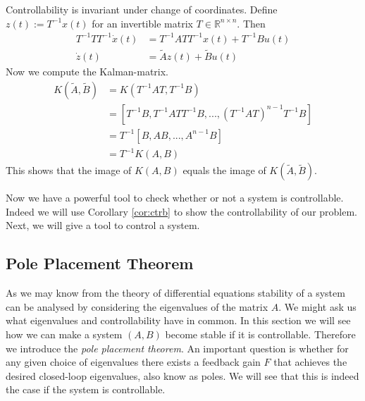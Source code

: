 \begin{myrem}\label{rem:2.11}
    Controllability is invariant under change of coordinates. Define $z(t) := T^{-1} x(t)$ for an invertible matrix $T \in \mathbb{R}^{n\times n}$. Then
\begin{align*}
	T^{-1}TT^{-1}\dot{x}(t) &= T^{-1}ATT^{-1}x(t)+T^{-1}Bu(t)\\
	\dot{z}(t) &= \tilde{A}z(t) + \tilde{B}u(t)
\end{align*}
Now we compute the Kalman-matrix.
\begin{align*}
	K(\tilde{A},\tilde{B}) &= K(T^{-1}AT, T^{-1}B)\\
	&= [T^{-1}B, T^{-1}ATT^{-1}B,...,(T^{-1}AT)^{n-1}T^{-1}B] \\
	&= T^{-1} [B,AB,...,A^{n-1}B] \\
	&= T^{-1}K(A,B)
\end{align*}
This shows that the image of $K(A,B)$ equals the image of $K(\tilde{A},\tilde{B})$.
\end{myrem}

Now we have a powerful tool to check whether or not a system is controllable. Indeed we will use Corollary \ref{cor:ctrb} to show the controllability of our problem. Next, we will give a tool to control a system.

\subsection{Pole Placement Theorem}\label{sec:ppthm}

As we may know from the theory of differential equations stability of a system can be analysed by considering the eigenvalues of the matrix $A$. We might ask us what eigenvalues and controllability have in common. In this section we will see how we can make a system $(A,B)$ become stable if it is controllable. Therefore we introduce the \emph{pole placement theorem}. An important question is whether for any given choice of eigenvalues there exists a feedback gain $F$ that achieves the desired closed-loop eigenvalues, also know as poles. We will see that this is indeed the case if the system is controllable.

